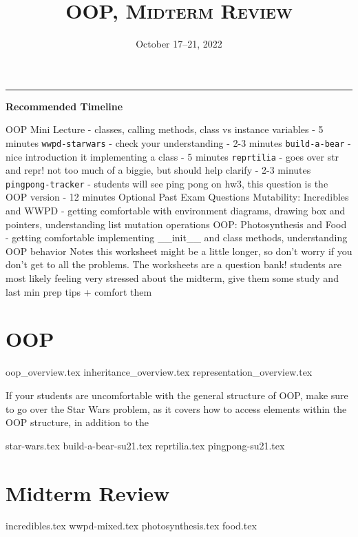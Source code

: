\documentclass{exam}
\title{\textsc{OOP, Midterm Review}}
\date{October 17--21, 2022}
\begin{document}
	\maketitle
	\rule{\textwidth}{0.15em}
	\fontsize{12}{15}\selectfont

\begin{guide}
	\textbf{Recommended Timeline}
	\begin{outline}[enumerate]
		\1 OOP Mini Lecture - classes, calling methods, class vs instance variables - 5 minutes
		\1 \lstinline{wwpd-starwars} - check your understanding - 2-3 minutes
		\1 \lstinline{build-a-bear} - nice introduction it implementing a class - 5 minutes
		\1 \lstinline{reprtilia} - goes over str and repr! not too much of a biggie, but should help clarify - 2-3 minutes
		\1 \lstinline{pingpong-tracker} - students will see ping pong on hw3, this question is the OOP version - 12 minutes
		\1 Optional Past Exam Questions
		\2 Mutability: Incredibles and WWPD - getting comfortable with environment diagrams, drawing box and pointers, understanding list mutation operations
		\2 OOP: Photosynthesis and Food - getting comfortable implementing __init__ and class methods, understanding OOP behavior
		\1 Notes
		\2 this worksheet might be a little longer, so don't worry if you don't get to all the problems. The worksheets are a question bank!
		\2 students are most likely feeling very stressed about the midterm, give them some study and last min prep tips + comfort them
	\end{outline}
\end{guide}


\section{OOP}
{oop_overview.tex}
{inheritance_overview.tex}
{representation_overview.tex}
\begin{meta}
	If your students are uncomfortable with the general structure of OOP, make sure to go over the Star Wars problem, as it covers how to access elements within the OOP structure, in addition to the 
\end{meta}
\newpage
\begin{questions}
{star-wars.tex}
\newpage
{build-a-bear-su21.tex}
{reprtilia.tex}
{pingpong-su21.tex}
\end{questions}

\section{Midterm Review}
\begin{questions}
{incredibles.tex}
\newpage
{wwpd-mixed.tex}
\newpage
{photosynthesis.tex}
\newpage
{food.tex}
\end{questions}
\end{document}
